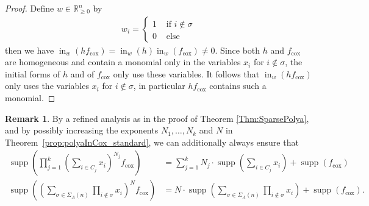 \documentclass[a4paper,11pt]{amsart}
\theoremstyle{definition}
\newtheorem{remark}[theorem]{Remark}
\DeclareMathOperator{\initial}{in}
\DeclareMathOperator{\supp}{supp}
\newcommand{\RR}{\mathbb{R}}
\newcommand{\cox}{\mathrm{cox}}
\begin{document}
\begin{proof}
Define $w\in \RR_{\geq 0}^n$ by \begin{align*}
    w_i=\begin{cases}
        1 & \text{ if } i \notin \sigma \\ 0 & \text{ else }
    \end{cases}
\end{align*}
then we have $\initial_w(hf_\cox)=\initial_w(h)\initial_w(f_\cox)\neq 0$. Since both $h$ and $f_\cox$ are homogeneous and contain a monomial only in the variables $x_i$ for $i\notin \sigma$, the initial forms of $h$ and of $f_\cox$ only use these variables. It follows that $\initial_w(hf_\cox)$ only uses the variables $x_i$ for $i\notin \sigma$, in particular $hf_\cox$ contains such a monomial.
\end{proof}
\begin{remark}
    By a refined analysis as in the proof of Theorem \ref{Thm:SparsePolya}, and by possibly increasing the exponents $N_1,\ldots, N_k$ and $N$ in Theorem~\ref{prop:polyaInCox_standard}, we can additionally always ensure that \begin{align*}
        \supp\left(\prod_{j=1}^k\left(\sum_{i\in C_j}x_i\right)^{N_j }f_\cox\right)&=\sum_{j=1}^kN_j\cdot \supp\left(\sum_{i\in C_j}x_i\right)+\supp(f_\cox) \\
        \supp\left(\left(  \sum_{\sigma \in \Sigma_A(n)} \prod_{i \notin \sigma} x_i  \right)^N f_\cox \right)&=N\cdot \supp\left( \sum_{\sigma \in \Sigma_A(n)} \prod_{i \notin \sigma} x_i\right)+\supp(f_\cox).
    \end{align*} 
\end{remark}
\end{document}
